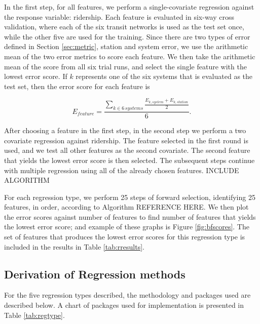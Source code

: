 \documentclass[11pt]{article}
\begin{document}
In the first step, for all features, we perform a single-covariate regression against the response variable: ridership. Each feature is evaluated in six-way cross validation, where each of the six transit networks is used as the test set once, while the other five are used for the training. Since there are two types of error defined in Section \ref{sec:metric}, station and system error, we use the arithmetic mean of the two error metrics to score each feature. We then take the arithmetic mean of the score from all six trial runs, and select the single feature with the lowest error score. If $k$ represents one of the six systems that is evaluated as the test set, then the error score for each feature is

$$ E_{feature} = \displaystyle\frac{\sum\limits_{k\in 6\,systems}\displaystyle\frac{E_{k, system} + E_{k, station}}{2}}{6}.$$

After choosing a feature in the first step, in the second step we perform a two covariate regression against ridership. The feature selected in the first round is used, and we test all other features as the second covariate. The second feature that yields the lowest error score is then selected. The subsequent steps continue with multiple regression using all of the already chosen features. INCLUDE ALGORITHM

For each regression type, we perform 25 steps of forward selection, identifying 25 features, in order, according to Algorithm REFERENCE HERE. We then plot the error scores against number of features to find number of features that yields the lowest error score; and example of these graphs is Figure \ref{fig:bfscores}. The set of features that produces the lowest error scores for this regression type is included in the results in Table \ref{tab:rresults}.


\subsection{Derivation of Regression methods}\label{sec:derive}
For the five regression types described, the methodology and packages used are described below. A chart of packages used for implementation is presented in Table \ref{tab:regtype}.
\end{document}
